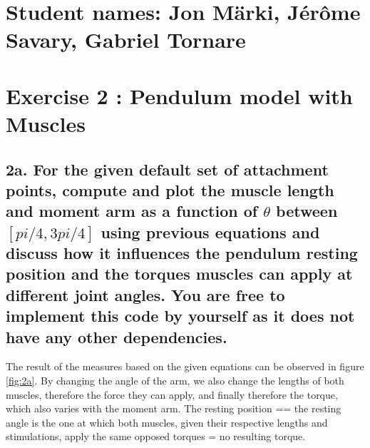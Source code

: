 \documentclass{cmc}
\begin{document}
\pagestyle{fancy}
 

\section*{Student names: Jon Märki, Jérôme Savary, Gabriel Tornare}

\section*{Exercise 2 : Pendulum model with Muscles}


\subsection*{2a. For the given default set of attachment points,
  compute and plot the muscle length and moment arm as a function of
  $\theta$ between $[pi/4, 3pi/4]$ using previous equations and discuss how it influences the pendulum resting position and the torques muscles can apply at different 
  joint angles. You are free to implement this code by yourself as it
  does not have any other dependencies.}
\label{sec:2a}


The result of the measures based on the given equations can be observed in figure \ref{fig:2a}. By changing the angle of the arm, we also change the lengths of both muscles, therefore the force they can apply, and finally therefore the torque, which also varies with the moment arm. The resting position == the resting angle is the one at which both muscles, given their respective lengths and stimulations, apply the same opposed torques = no resulting torque.

\end{document}
